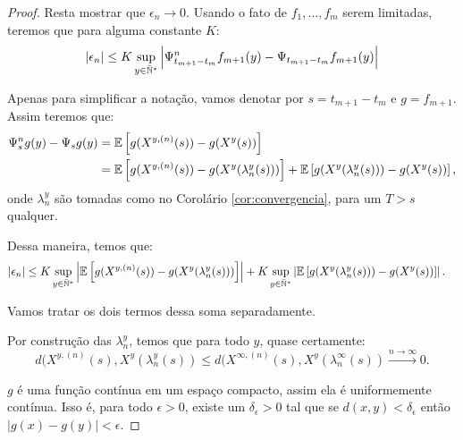 \begin{proof}
  Resta mostrar que $\epsilon_n \to 0$. Usando o fato de $f_1, \ldots,
  f_m$ serem limitadas, teremos que para alguma constante $K$:
  \begin{displaymath}
    |\epsilon_n| \leq  K \sup_{y \in {\mathbb{\bar{N}^*}}} \left\lvert
      \Psi^n_{t_{m+1}-t_m} f_{m+1} (y) - 
      \Psi_{t_{m+1}-t_m} f_{m+1} (y) 
    \right\rvert
  \end{displaymath}

  Apenas para simplificar a notação, vamos denotar por $s = t_{m+1} -
  t_m$ e $g = f_{m+1}$. Assim teremos que:
  \begin{align*}
    \Psi^n_{s} g (y) - \Psi_{s} g (y)
    &= {\mathbb{E}} \left[g(X^{y, (n)}(s)) - g(X^y(s)) \right] \notag \\
    &= {\mathbb{E}} \left[g(X^{y, (n)}(s)) - g(X^y(\lambda_n^y(s))) \right]
    + {\mathbb{E}} \left[g(X^y(\lambda_n^y(s))) - g(X^y(s)) \right],
  \end{align*}
  onde $\lambda_n^y$ são tomadas como no Corolário
  \ref{cor:convergencia}, para um $T > s$ qualquer.

  Dessa maneira, temos que:
  \begin{align}
    \label{eq:esperancas-markov}
    |\epsilon_n| &\leq 
    K \sup_{y\in{\mathbb{\bar{N}^*}}}\left\lvert
      {\mathbb{E}} \left[g(X^{y, (n)}(s)) - g(X^y(\lambda_n^y(s))) \right]
    \right\rvert
    + K \sup_{y\in{\mathbb{\bar{N}^*}}}\left\lvert
      {\mathbb{E}} \left[g(X^y(\lambda_n^y(s))) - g(X^y(s)) \right]
    \right\rvert. 
  \end{align}

  Vamos tratar os dois termos dessa soma separadamente.

  Por construção das $\lambda_n^y$, temos que para todo $y$, quase certamente:
  \begin{displaymath}
    d(X^{y, (n)}(s), X^y(\lambda_n^y(s)) \leq
    d(X^{\infty, (n)}(s), X^y(\lambda_n^\infty(s))
    \xrightarrow{n\to\infty} 0.
  \end{displaymath}

  $g$ é uma função contínua em um espaço compacto, assim ela é
  uniformemente contínua. Isso é, para todo $\epsilon > 0$, existe um
  $\delta_\epsilon > 0$ tal que se $d(x, y) < \delta_\epsilon$ então
  $|g(x)-g(y)| < \epsilon$.


\end{proof}
